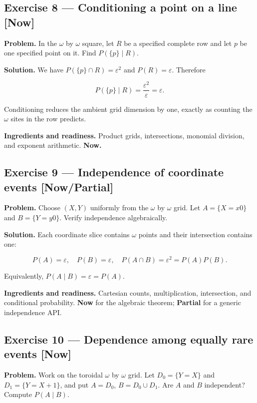 \documentclass[11pt]{article}
\newcommand{\eps}{\varepsilon}
\renewcommand{\epsilon}{\varepsilon}
\begin{document}
\subsection*{Exercise 8 --- Conditioning a point on a line \hfill \normalfont\small[Now]}

\textbf{Problem.} In the $\omega$ by $\omega$ square, let $R$ be a specified complete
row and let $p$ be one specified point on it. Find $P(\{p\}\mid R)$.

\textbf{Solution.} We have $P(\{p\}\cap R)=\eps^2$ and $P(R)=\eps$.
Therefore

\[
P(\{p\}\mid R)=\frac{\epsilon^2}{\epsilon}=\epsilon.
\]

Conditioning reduces the ambient grid dimension by one, exactly as counting
the $\omega$ sites in the row predicts.

\textbf{Ingredients and readiness.} Product grids, intersections, monomial
division, and exponent arithmetic. \textbf{Now.}


\subsection*{Exercise 9 --- Independence of coordinate events \hfill \normalfont\small[Now/Partial]}

\textbf{Problem.} Choose $(X,Y)$ uniformly from the $\omega$ by $\omega$ grid. Let
$A = \{X=x0\}$ and $B = \{Y=y0\}$. Verify independence algebraically.

\textbf{Solution.} Each coordinate slice contains $\omega$ points and their
intersection contains one:

\[
P(A)=\epsilon,
\quad P(B)=\epsilon,
\quad P(A\cap B)=\epsilon^2
=P(A)P(B).
\]

Equivalently, $P(A\mid B)=\eps=P(A)$.

\textbf{Ingredients and readiness.} Cartesian counts, multiplication, intersection,
and conditional probability. \textbf{Now} for the algebraic theorem; \textbf{Partial}
for a generic independence API.


\subsection*{Exercise 10 --- Dependence among equally rare events \hfill \normalfont\small[Now]}

\textbf{Problem.} Work on the toroidal $\omega$ by $\omega$ grid. Let
$D_{0} = \{Y=X\}$ and $D_{1} = \{Y=X+1\}$, and put $A=D_{0}$, $B=D_{0}\cup D_{1}$. Are $A$ and
$B$ independent? Compute $P(A\mid B)$.
\end{document}

